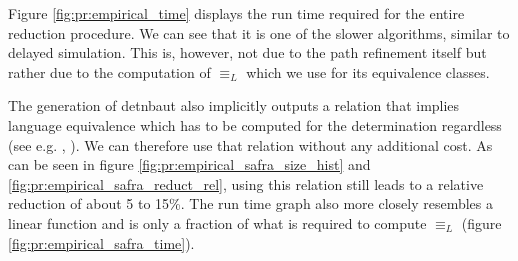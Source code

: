 Figure \ref{fig:pr:empirical_time} displays the run time required for the entire reduction procedure. We can see that it is one of the slower algorithms, similar to delayed simulation. This is, however, not due to the path refinement itself but rather due to the computation of $\equiv_L$ which we use for its equivalence classes.

The generation of \textsf{detnbaut} also implicitly outputs a relation that implies language equivalence which has to be computed for the determination regardless (see e.g. \cite{Schewe2009}, \cite{Piterman2007}). We can therefore use that relation without any additional cost. As can be seen in figure \ref{fig:pr:empirical_safra_size_hist} and \ref{fig:pr:empirical_safra_reduct_rel}, using this relation still leads to a relative reduction of about 5 to 15\%. The run time graph also more closely resembles a linear function and is only a fraction of what is required to compute $\equiv_L$ (figure \ref{fig:pr:empirical_safra_time}).

